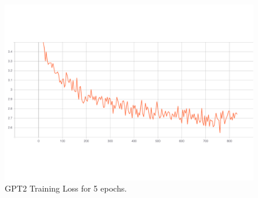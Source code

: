 \documentclass{article}
\begin{document}
\begin{figure}[tb]
 \centering
\includegraphics[width=0.7\columnwidth]{finetune_condgen_train_loss.pdf}
\vspace{-4mm}
\caption{GPT2 Training Loss for 5 epochs.}
\label{Fig:get_finetune_loss_fig}
\vspace{-3mm}
\end{figure}
\end{document}
